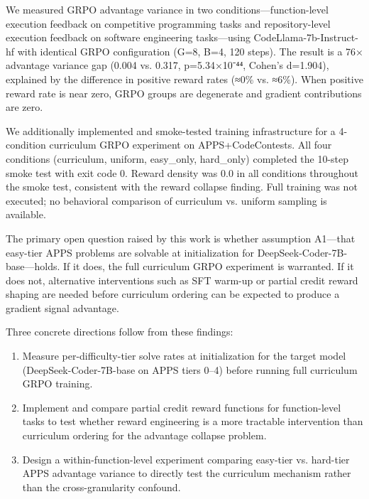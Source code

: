 
We measured GRPO advantage variance in two conditions—function-level execution feedback on competitive programming tasks and repository-level execution feedback on software engineering tasks—using CodeLlama-7b-Instruct-hf with identical GRPO configuration (G=8, B=4, 120 steps). The result is a 76× advantage variance gap (0.004 vs. 0.317, p=5.34×10⁻⁴⁴, Cohen's d=1.904), explained by the difference in positive reward rates (≈0\% vs. ≈6\%). When positive reward rate is near zero, GRPO groups are degenerate and gradient contributions are zero.

We additionally implemented and smoke-tested training infrastructure for a 4-condition curriculum GRPO experiment on APPS+CodeContests. All four conditions (curriculum, uniform, easy_only, hard_only) completed the 10-step smoke test with exit code 0. Reward density was 0.0 in all conditions throughout the smoke test, consistent with the reward collapse finding. Full training was not executed; no behavioral comparison of curriculum vs. uniform sampling is available.

The primary open question raised by this work is whether assumption A1—that easy-tier APPS problems are solvable at initialization for DeepSeek-Coder-7B-base—holds. If it does, the full curriculum GRPO experiment is warranted. If it does not, alternative interventions such as SFT warm-up or partial credit reward shaping are needed before curriculum ordering can be expected to produce a gradient signal advantage.

Three concrete directions follow from these findings:

\begin{enumerate}
\item Measure per-difficulty-tier solve rates at initialization for the target model (DeepSeek-Coder-7B-base on APPS tiers 0–4) before running full curriculum GRPO training.
\item Implement and compare partial credit reward functions for function-level tasks to test whether reward engineering is a more tractable intervention than curriculum ordering for the advantage collapse problem.
\item Design a within-function-level experiment comparing easy-tier vs. hard-tier APPS advantage variance to directly test the curriculum mechanism rather than the cross-granularity confound.
\end{enumerate}
